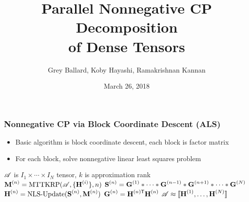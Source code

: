 \documentclass[xcolor=dvipsnames]{beamer}
\title{Parallel Nonnegative CP Decomposition \\ of Dense Tensors}
\author[]{Grey Ballard, Koby Hayashi, Ramakrishnan Kannan}
\institute{}
\date{March 26, 2018}
\newcommand{\red}[1]{\textcolor{red}{#1}}
\newcommand{\blue}[1]{\textcolor{blue}{#1}}
\begin{document}
\begin{frame}[plain]
\maketitle
\end{frame}
\addtocounter{framenumber}{-1}

\begin{frame}
\frametitle{Nonnegative CP via Block Coordinate Descent (ALS)}

\footnotesize
\begin{itemize}
	\item Basic algorithm is block coordinate descent, each block is factor matrix
	\item For each block, solve nonnegative linear least squares problem
\end{itemize}
\normalsize

\vfill

\begin{algorithmic}[1]
\Require $\TA$ is $I_1\times \cdots \times I_N$ tensor, $k$ is approximation rank
	\State {}
	\State {}
	\State \red{$\Mn{M}{n} = \text{MTTKRP}(\TA,\{\Mn{H}{i}\},n)$}
	\State $\Mn{S}{n} = \Mn{G}{1} \Hada \cdots \Hada \Mn{G}{n-1} \Hada \Mn{G}{n+1} \Hada \cdots \Hada \Mn{G}{N}$
	\State \blue{$\Mn{H}{n} = \text{NLS-Update}(\Mn{S}{n},\Mn{M}{n})$}
	\State $\Mn{G}{n} = \MnTra{H}{n}\Mn{H}{n}$
	\EndFor
\EndWhile
\Ensure $\TA \approx \CP$
\end{algorithmic}

\end{frame}

\begin{frame}

\end{frame}
\end{document}

